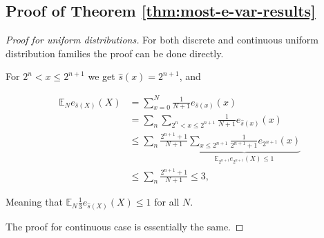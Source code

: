 \documentclass{article}
\theoremstyle{definition}
\theoremstyle{definition}
\newcommand{\expectE}{\mathbb{E}}
\begin{document}
\subsection{Proof of Theorem \ref{thm:most-e-var-results}}

\begin{proof}[Proof for uniform distributions]

For both discrete and continuous uniform  distribution families the proof can be done directly. 

For $2^n < x \le 2^{n+1}$ we get $\hat{s}(x)=2^{n+1}$, and

\begin{align*}
    \expectE_N e_{\hat{s}(X)}(X) &= \sum_{x=0}^N \frac{1}{N+1} e_{\hat{s}(x)}(x)\\
    &= \sum_n \sum_{2^n < x \le 2^{n+1}} \frac{1}{N+1} e_{\hat{s}(x)}(x)\\
    &\le \sum_n \frac{2^{n+1}+1}{N+1} \underbrace{\sum_{x\le2^{n+1}}\frac{1}{2^{n+1}+1}e_{2^{n+1}}(x)}_{\expectE_{2^{n+1}}e_{2^{n+1}}(X)\le1}\\
    &\le \sum_n \frac{2^{n+1}+1}{N+1} \le 3,
\end{align*}

Meaning that $\expectE_N \frac{1}{3}e_{\hat{s}(X)}(X) \le 1$ for all $N$.

The proof for continuous case is essentially the same.
\end{proof}
\end{document}
